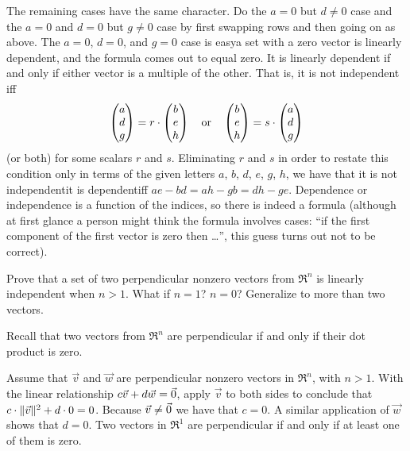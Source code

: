 \begin{exercises}
\begin{answer}
\begin{exparts}
         The remaining cases have the same character.
         Do the \( a=0 \) but \( d\neq 0 \) case and the \( a=0 \) and
         \( d=0 \) but \( g\neq 0 \) case by first swapping rows and
         then going on as above.
         The \( a=0 \), \( d=0 \), and \( g=0 \) case is easy\Dash a set with a
         zero vector is linearly dependent, and the formula comes out
         to equal zero.
       \partsitem It is linearly dependent if and only if either vector is a
         multiple of the other.
         That is, it is not independent iff
         \begin{equation*}
           \begin{pmatrix} a \\ d \\ g \end{pmatrix}=r\cdot\begin{pmatrix} b \\ e \\ h \end{pmatrix}
           \quad\text{or}\quad
           \begin{pmatrix} b \\ e \\ h \end{pmatrix}=s\cdot\begin{pmatrix} a \\ d \\ g \end{pmatrix}
         \end{equation*}
         (or both) for some scalars $r$ and $s$.
         Eliminating $r$ and $s$ in order to restate this condition only in
         terms of the given letters $a$, $b$, $d$, $e$, $g$, $h$, we have that 
         it is not independent\Dash it is dependent\Dash iff
         \( ae-bd=ah-gb=dh-ge \).
       \partsitem Dependence or independence is a function of the
         indices, so there
         is indeed a formula (although at first glance a person might think
         the formula involves cases: ``if the first component of the first
         vector is zero then \ldots'', this guess turns out not to be 
         correct).
      \end{exparts}  
    \end{answer}
  \recommended \item  
    \begin{exparts}
      \partsitem Prove that a set of two perpendicular 
        nonzero vectors from
        \( \Re^n \) is linearly independent when \( n>1 \).
      \partsitem What if \( n=1 \)?
        \( n=0 \)?
      \partsitem Generalize to more than two vectors.
    \end{exparts}
    \begin{answer}
      Recall that two vectors from \( \Re^n \) are perpendicular if and
      only if their dot product is zero.
      \begin{exparts}
         \partsitem Assume that \( \vec{v} \) and \( \vec{w} \) are
           perpendicular nonzero vectors in $\Re^n$, with \( n>1 \).
           With the linear relationship \( c\vec{v}+d\vec{w}=\vec{0} \), 
           apply \( \vec{v} \) to both
           sides to conclude that \( c\cdot\|\vec{v}\|^2+d\cdot 0=0 \).
           Because \( \vec{v}\neq\vec{0} \) we have that \( c=0 \).
           A similar application of \( \vec{w} \) shows that \( d=0 \).
         \partsitem Two vectors in \( \Re^1 \) are perpendicular if and only if
           at least one of them is zero.


\end{exparts}
\end{answer}
\end{exercises}
